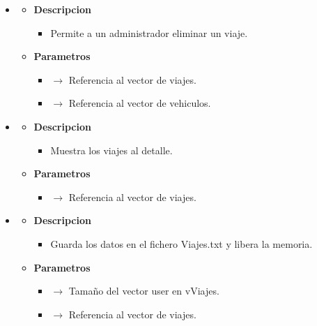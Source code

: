 \begin{itemize}
\begin{itemize}
	\end{itemize}
    \item \label{editviadmin}
    \begin{itemize}
        \item \textbf{Descripcion}
        \begin{itemize}
			\item Permite a un administrador eliminar un viaje.
		\end{itemize}
		\item \textbf{Parametros}
		\begin{itemize}
			\item {}  $\rightarrow$ Referencia al vector de viajes.
            \item {} $\rightarrow$ Referencia al vector de vehiculos.
		\end{itemize}
	\end{itemize}
    \item \label{listviadmin}
    \begin{itemize}
        \item \textbf{Descripcion}
        \begin{itemize}
			\item  Muestra los viajes al detalle.
		\end{itemize}
		\item \textbf{Parametros}
		\begin{itemize}
			\item {}  $\rightarrow$ Referencia al vector de viajes.
		\end{itemize}
	\end{itemize}
    \item \label{savevi}
    \begin{itemize}
        \item \textbf{Descripcion}
        \begin{itemize}
			\item  Guarda los datos en el fichero Viajes.txt y libera la memoria.
		\end{itemize}
		\item \textbf{Parametros}
		\begin{itemize}
            \item {} $\rightarrow$ Tamaño del vector user en vViajes.
			\item {} $\rightarrow$ Referencia al vector de viajes.
		\end{itemize}

\end{itemize}
\end{itemize}
